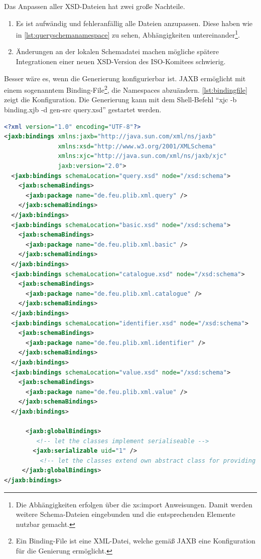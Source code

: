 Das Anpassen aller XSD-Dateien hat zwei große Nachteile.
\begin{enumerate}
\item Es ist aufwändig und fehleranfällig alle Dateien anzupassen. Diese haben wie in \autoref{lst:queryschemanamespace} zu sehen, Abhängigkeiten untereinander\footnote{Die Abhängigkeiten erfolgen über die xs:import Anweisungen. Damit werden weitere Schema-Dateien eingebunden und die entsprechenden Elemente nutzbar gemacht.}.
\item Änderungen an der lokalen Schemadatei machen mögliche spätere Integrationen einer neuen XSD-Version des ISO-Komitees schwierig.
\end{enumerate}

Besser wäre es, wenn die Generierung konfigurierbar ist. \gls{JAXB} ermöglicht mit einem sogenanntem Binding-File\footnote{Ein Binding-File ist eine XML-Datei, welche gemäß JAXB eine Konfiguration für die Genierung ermöglicht.}, die \Glspl{Namespace} abzuändern. \autoref{lst:bindingfile} zeigt die Konfiguration. Die Generierung kann mit dem Shell-Befehl \enquote{xjc -b binding.xjb -d gen-src query.xsd} gestartet werden.  

\begin{lstlisting}[caption=Binding File binding.xjc, language=XML, label=lst:bindingfile]
<?xml version="1.0" encoding="UTF-8"?>
<jaxb:bindings xmlns:jaxb="http://java.sun.com/xml/ns/jaxb"
               xmlns:xsd="http://www.w3.org/2001/XMLSchema"
               xmlns:xjc="http://java.sun.com/xml/ns/jaxb/xjc"
               jaxb:version="2.0">
  <jaxb:bindings schemaLocation="query.xsd" node="/xsd:schema">
    <jaxb:schemaBindings>
      <jaxb:package name="de.feu.plib.xml.query" />
    </jaxb:schemaBindings>
  </jaxb:bindings>
  <jaxb:bindings schemaLocation="basic.xsd" node="/xsd:schema">
    <jaxb:schemaBindings>
      <jaxb:package name="de.feu.plib.xml.basic" />
    </jaxb:schemaBindings>
  </jaxb:bindings>
  <jaxb:bindings schemaLocation="catalogue.xsd" node="/xsd:schema">
    <jaxb:schemaBindings>
      <jaxb:package name="de.feu.plib.xml.catalogue" />
    </jaxb:schemaBindings>
  </jaxb:bindings>
  <jaxb:bindings schemaLocation="identifier.xsd" node="/xsd:schema">
    <jaxb:schemaBindings>
      <jaxb:package name="de.feu.plib.xml.identifier" />
    </jaxb:schemaBindings>
  </jaxb:bindings>
  <jaxb:bindings schemaLocation="value.xsd" node="/xsd:schema">
    <jaxb:schemaBindings>
      <jaxb:package name="de.feu.plib.xml.value" />
    </jaxb:schemaBindings>
  </jaxb:bindings> 
  
      <jaxb:globalBindings>
         <!-- let the classes implement serialiseable -->
        <jaxb:serializable uid="1" />
          <!-- let the classes extend own abstract class for providing some extra functionality for each one -->
     </jaxb:globalBindings>  
</jaxb:bindings> 
\end{lstlisting}


